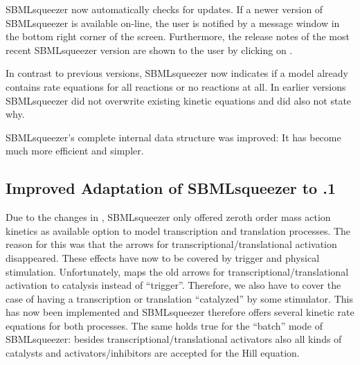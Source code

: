 \begin{dinglist}{52}
\item SBMLsqueezer now automatically checks for updates. If a newer version of
SBMLsqueezer is available on-line, the user is notified by a message window in
the bottom right corner of the screen. Furthermore, the release notes of the
most recent SBMLsqueezer version are shown to the user by clicking on .

\item In contrast to previous versions, SBMLsqueezer now indicates if a model already
contains rate equations for all reactions or no reactions at all. In earlier
versions SBMLsqueezer did not overwrite existing kinetic equations and did also
not state why.

\item SBMLsqueezer's complete internal data structure was improved: It has become much
more efficient and simpler.
\end{dinglist}

\subsection{Improved Adaptation of SBMLsqueezer to .1}

Due to the changes in \CellDesigner, SBMLsqueezer only offered zeroth order mass
action kinetics as available option to model transcription and translation
processes. The reason for this was that the arrows for
transcriptional/translational activation disappeared. These effects have now to
be covered by trigger and physical stimulation. Unfortunately, \CellDesigner maps
the old arrows for transcriptional/translational activation to catalysis instead
of ``trigger''. Therefore, we also have to cover the case of having a
transcription or translation ``catalyzed'' by some stimulator. This has now been
implemented and SBMLsqueezer therefore offers several kinetic rate equations for
both processes. The same holds true for the ``batch'' mode of SBMLsqueezer:
besides transcriptional/translational activators also all kinds of catalysts and
activators/inhibitors are accepted for the Hill equation.

